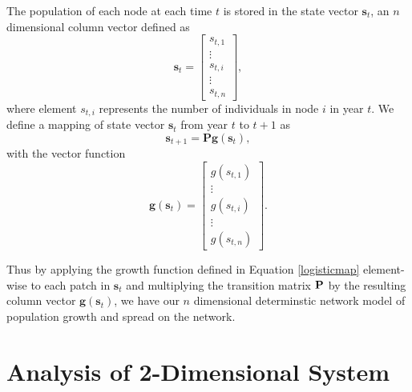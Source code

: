 \documentclass[12pt, openany]{book}
\theoremstyle{definition}
\theoremstyle{remark}
\numberwithin{equation}{chapter}
\numberwithin{figure}{chapter}
\begin{document}
The population of each node at each time $t$ is stored in the state vector $\mathbf{s}_{t}$, an $n$ dimensional column vector defined as
\begin{equation}\label{statevector}
\mathbf{s}_{t} = 
\begin{bmatrix}
s_{t,1} \\
\vdots \\ 
s_{t,i} \\
\vdots \\ 
s_{t,n}
\end{bmatrix},
\end{equation}
where element $s_{t,i}$ represents the number of individuals in node $i$ in year $t$. We define a mapping of state vector $\mathbf{s}_{t}$ from year $t$ to $t+1$ as
\begin{equation}\label{generalmodeleq}
\mathbf{s}_{{t+1}} = \textbf{P}\textbf{g}(\mathbf{s}_{t}),
\end{equation}
with the vector function 
\begin{equation}\label{vectorlogmap}
\textbf{g}(\mathbf{s}_{t}) = 
\begin{bmatrix}
g(s_{t,1}) \\
\vdots \\ 
g(s_{t,i}) \\
\vdots \\ 
g(s_{t,n})
\end{bmatrix}.
\end{equation}

Thus by applying the growth function defined in Equation \ref{logisticmap} element-wise to each patch in $\mathbf{s}_{t}$ and multiplying the transition matrix $\bf{P}$ by the resulting column vector $\textbf{g}(\mathbf{s}_{t})$, we have our $n$ dimensional determinstic network model of population growth and spread on the network.

\section{Analysis of 2-Dimensional System}
\end{document}
